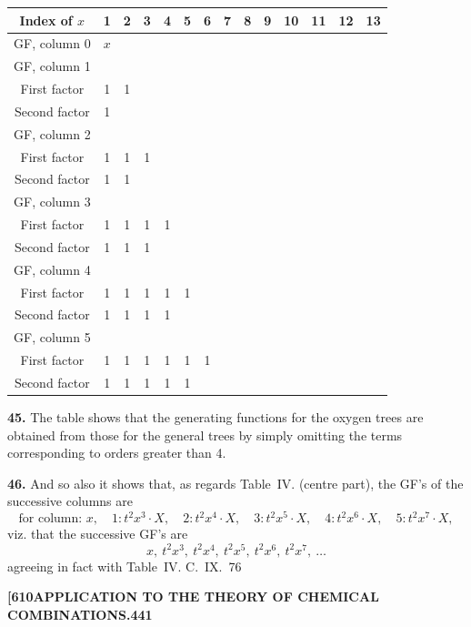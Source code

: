 \documentclass[11pt,a4paper]{article}
\begin{document}
{\begin{center}
\small
\begin{tabular}{|c|c|c|c|c|c|c|c|c|c|c|c|c|c|}
\hline
Index of $x$ & 1 & 2 & 3 & 4 & 5 & 6 & 7 & 8 & 9 & 10 & 11 & 12 & 13 \\
\hline
GF, column 0 & $x$ & & & & & & & & & & & & \\
\hline
GF, column 1 & & & & & & & & & & & & & \\
First factor & 1 & 1 & & & & & & & & & & & \\
Second factor & 1 & & & & & & & & & & & & \\
\hline
GF, column 2 & & & & & & & & & & & & & \\
First factor & 1 & 1 & 1 & & & & & & & & & & \\
Second factor & 1 & 1 & & & & & & & & & & & \\
\hline
GF, column 3 & & & & & & & & & & & & & \\
First factor & 1 & 1 & 1 & 1 & & & & & & & & & \\
Second factor & 1 & 1 & 1 & & & & & & & & & & \\
\hline
GF, column 4 & & & & & & & & & & & & & \\
First factor & 1 & 1 & 1 & 1 & 1 & & & & & & & & \\
Second factor & 1 & 1 & 1 & 1 & & & & & & & & & \\
\hline
GF, column 5 & & & & & & & & & & & & & \\
First factor & 1 & 1 & 1 & 1 & 1 & 1 & & & & & & & \\
Second factor & 1 & 1 & 1 & 1 & 1 & & & & & & & & \\
\hline
\end{tabular}
\end{center}

\medskip
\noindent\textbf{45.}
The table shows that the generating functions for the oxygen trees are obtained from those for the general trees by simply omitting the terms corresponding to orders greater than 4.

\medskip
\noindent\textbf{46.}
And so also it shows that, as regards Table~IV. (centre part), the GF's of the successive columns are
\[
\text{for column: } x,\quad 1: t^2x^3 \cdot X,\quad 2: t^2x^4 \cdot X,\quad 3: t^2x^5 \cdot X,\quad 4: t^2x^6 \cdot X,\quad 5: t^2x^7 \cdot X,
\]
viz. that the successive GF's are
\[
x,\ t^2x^3,\ t^2x^4,\ t^2x^5,\ t^2x^6,\ t^2x^7,\ \ldots
\]
agreeing in fact with Table~IV.
\hfill C.~IX.\ 76

\newpage
\noindent\textbf{[610}\hspace{\fill}\textbf{APPLICATION TO THE THEORY OF CHEMICAL COMBINATIONS.}\hspace{\fill}\textbf{441}

}
\end{document}
